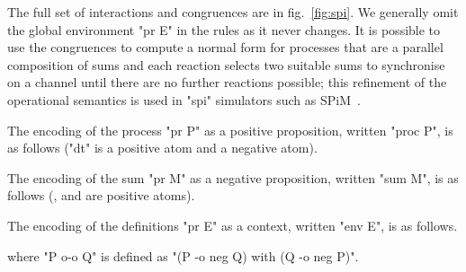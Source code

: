 \documentclass{article}
\begin{document}

\begin{figure*}[tp]
\small
\hspace{-1.8em}
\caption{Interactions and congruence in \spi. The environment  is elided in most rules.}
\label{fig:spi}
\end{figure*}

The full set of interactions and congruences are in fig.~\ref{fig:spi}. We
generally omit the global environment "pr E" in the rules as it never changes.
It is possible to use the congruences to compute a normal form for processes
that are a parallel composition of sums and each reaction selects two suitable
sums to synchronise on a channel until there are no further reactions possible;
this refinement of the operational semantics is used in "spi" simulators such as
SPiM~\cite{phillips04bc}.

\bgroup \begin{defn} \mbox{} \label{defn:sencoding}
  \begin{ecom}[1.]
  \item The encoding of the process "pr P" as a positive proposition, written
    "proc P", is as follows ("dt" is a positive atom and \crt a negative atom).
    
  \item The encoding of the sum "pr M" as a negative proposition, written "sum
    M", is as follows (,  and  are positive atoms).
    
  \item The encoding of the definitions "pr E" as a context, written "env E", is
    as follows.
    
    where "P o-o Q" is defined as "(P -o neg Q) with (Q -o neg P)".
  \end{ecom}
\end{defn}
\egroup
\end{document}
